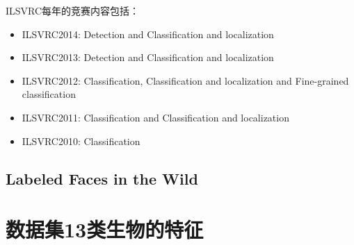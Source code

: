 \documentclass[12pt]{article}
\begin{document}
ILSVRC每年的竞赛内容包括：

\begin{itemize}
\item ILSVRC2014: {\color{blue}Detection} and {\color{blue}Classification and localization}
\item ILSVRC2013: {\color{blue}Detection} and {\color{blue}Classification and localization}
\item ILSVRC2012: {\color{blue}Classification}, {\color{blue}Classification and localization} and {\color{blue}Fine-grained classification}
\item ILSVRC2011: {\color{blue}Classification} and {\color{blue}Classification and localization}
\item ILSVRC2010: {\color{blue}Classification}
\end{itemize}

\subsection{Labeled Faces in the Wild}

\section{数据集13类生物的特征}
\end{document}
